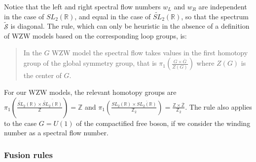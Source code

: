 \documentclass[12pt, a4paper, notitlepage, twoside]{report}
\numberwithin{equation}{section}
\theoremstyle{break}
\begin{document}
Notice that the left and right spectral flow numbers $w_L$ and $w_R$ are independent in the case of $SL_2(\mathbb{R})$, and equal in the case of $\widetilde{SL}_2(\mathbb{R})$, so that the spectrum $\tilde{\mathcal{S}}$ is diagonal.
The rule, which can only be heuristic in the absence of a definition of WZW models based on the corresponding loop groups, is:
\begin{quote}
 In the $G$ WZW model the spectral flow takes values in the first homotopy group of the global symmetry group, that is $\pi_1(\frac{G\times \bar{G}}{Z(G)})$ where $Z(G)$ is the center of $G$.
\end{quote}
For our WZW models, the relevant homotopy groups are 
$ \pi_1(\frac{\widetilde{SL}_2(\mathbb{R})\times \overline{\widetilde{SL}_2(\mathbb{R})}}{{\mathbb{Z}}}) = {\mathbb{Z}}$ and $\pi_1(\frac{SL_2({\mathbb{R}})\times \overline{SL_2({\mathbb{R}})}}{{\mathbb{Z}}_2}) = \frac{{\mathbb{Z}}\times \overline{{\mathbb{Z}}}}{{\mathbb{Z}}_2}$.
The rule also applies to the case $G=U(1)$ of the compactified free boson, if we consider the winding number as a spectral flow number. 

\subsubsection{Fusion rules}
\end{document}

